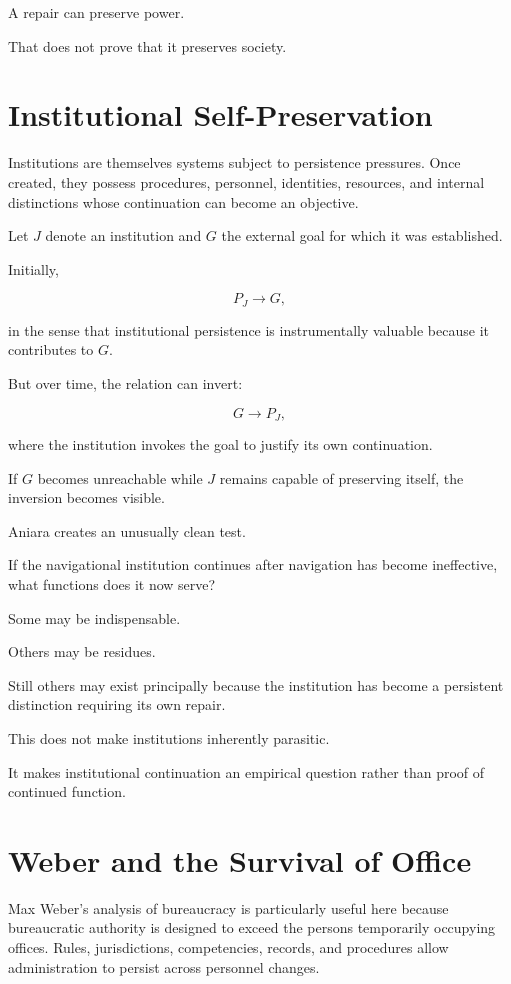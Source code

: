 \documentclass[11pt,oneside]{book}
\theoremstyle{definition}
\theoremstyle{remark}
\begin{document}
A repair can preserve power.

That does not prove that it preserves society.

\section{Institutional Self-Preservation}

Institutions are themselves systems subject to persistence pressures. Once created, they possess procedures, personnel, identities, resources, and internal distinctions whose continuation can become an objective.

Let \(J\) denote an institution and \(G\) the external goal for which it was established.

Initially,

\[
P_J
\rightarrow
G,
\]

in the sense that institutional persistence is instrumentally valuable because it contributes to \(G\).

But over time, the relation can invert:

\[
G
\rightarrow
P_J,
\]

where the institution invokes the goal to justify its own continuation.

If \(G\) becomes unreachable while \(J\) remains capable of preserving itself, the inversion becomes visible.

Aniara creates an unusually clean test.

If the navigational institution continues after navigation has become ineffective, what functions does it now serve?

Some may be indispensable.

Others may be residues.

Still others may exist principally because the institution has become a persistent distinction requiring its own repair.

This does not make institutions inherently parasitic.

It makes institutional continuation an empirical question rather than proof of continued function.

\section{Weber and the Survival of Office}

Max Weber's analysis of bureaucracy is particularly useful here because bureaucratic authority is designed to exceed the persons temporarily occupying offices. Rules, jurisdictions, competencies, records, and procedures allow administration to persist across personnel changes.
\end{document}
